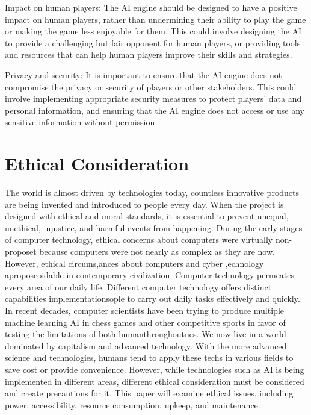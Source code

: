 \documentclass[10pt,twocolumn]{article}
\begin{document}
Impact on human players: The AI engine should be designed to have a positive impact on human players, rather than undermining their ability to play the game or making the game less enjoyable for them. This could involve designing the AI to provide a challenging but fair opponent for human players, or providing tools and resources that can help human players improve their skills and strategies.

Privacy and security: It is important to ensure that the AI engine does not compromise the privacy or security of players or other stakeholders. This could involve implementing appropriate security measures to protect players' data and personal information, and ensuring that the AI engine does not access or use any sensitive information without permission

    
\section{Ethical Consideration}
    The world is almost driven by technologies today, countless innovative products are being invented and introduced to people every day. When the project is designed with ethical and moral standards, it is essential to prevent unequal, unethical, injustice, and harmful events from happening. During the early stages of computer technology, ethical concerns about computers were virtually non-proposet because computers were not nearly as complex as they are now. However, ethical circums,ances about computers and cyber ,echnology aproposeoidable in contemporary civilization. Computer technology permeates every area of our daily life. Different computer technology offers distinct capabilities implementationsople to carry out daily tasks effectively and quickly. In recent decades, computer scientists have been trying to produce multiple machine learning AI in chess games and other competitive sports in favor of testing the limitations of both humanthroughoutnes. We now live in a world dominated by capitalism and advanced technology. With the more advanced science and technologies, humans tend to apply these techs in various fields to save cost or provide convenience. However, while technologies such as AI is being implemented in different areas, different ethical consideration must be considered and create precautions for it. This paper will examine ethical issues, including power, accessibility, resource consumption, upkeep, and maintenance.
\end{document}
